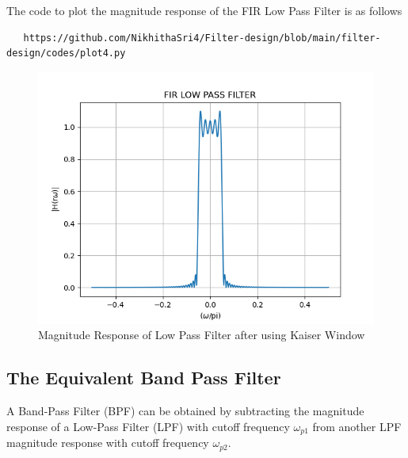 \documentclass{article}
\begin{document}
The code to plot the magnitude response of the FIR Low Pass Filter is as follows
\begin{lstlisting}
   https://github.com/NikhithaSri4/Filter-design/blob/main/filter-design/codes/plot4.py
\end{lstlisting}
\begin{figure}[H]
\centering
\includegraphics[width=1\columnwidth]{figs/FIR_Low_Filter.png}
\caption{Magnitude Response of Low Pass Filter after using Kaiser Window}
\label{fig:Kaiser_LPF_response}
\end{figure}

\subsection{The Equivalent Band Pass Filter}
A Band-Pass Filter (BPF) can be obtained by subtracting the magnitude response of a Low-Pass Filter (LPF) with cutoff frequency $\omega_{p1}$ from another LPF magnitude response with cutoff frequency $\omega_{p2}$.
\end{document}
